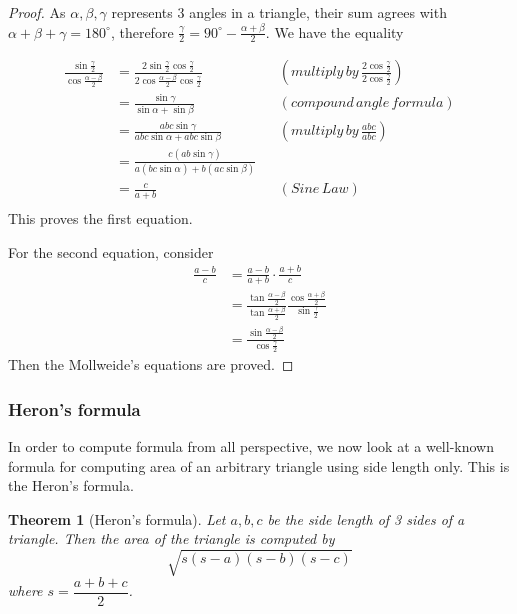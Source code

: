 \documentclass[12pt]{article}
\newtheorem*{theorem}{Theorem}
\begin{document}
    \begin{proof}
        As $\alpha,\beta,\gamma$ represents 3 angles in a triangle, their sum agrees with $\alpha+\beta+\gamma=180^\circ$, therefore $\frac{\gamma}{2}=90^\circ - \frac{\alpha+\beta}{2}$. We have the equality 
        
        \begin{align*}
            \frac{\sin{\frac{\gamma}{2}}}{\cos{\frac{\alpha-\beta}{2}}}&=\frac{2\sin{\frac{\gamma}{2}}\cos{\frac{\gamma}{2}}}{2\cos{\frac{\alpha-\beta}{2}}\cos{\frac{\gamma}{2}}}&&(multiply\, by\, \frac{2\cos{\frac{\gamma}{2}}}{2\cos{\frac{\gamma}{2}}})\\
            &=\frac{\sin{\gamma}}{\sin{\alpha}+\sin{\beta}}&&(compound\, angle\, formula)\\
            &=\frac{abc\sin{\gamma}}{abc\sin{\alpha}+abc\sin{\beta}}&&(multiply\, by\, \frac{abc}{abc})\\
            &=\frac{c(ab\sin{\gamma})}{a(bc\sin{\alpha})+b(ac\sin{\beta})}\\
            &=\frac{c}{a+b}&&(Sine\, Law)\\
        \end{align*}
        This proves the first equation.

        For the second equation, consider \begin{align*}
            \frac{a-b}{c}&=\frac{a-b}{a+b}\cdot \frac{a+b}{c}\\
            &=\frac{\tan{\frac{\alpha-\beta}{2}}}{\tan{\frac{\alpha+\beta}{2}}}\frac{\cos{\frac{\alpha+\beta}{2}}}{\sin{\frac{\gamma}{2}}}\\
            &=\frac{\sin{\frac{\alpha-\beta}{2}}}{\cos{\frac{\gamma}{2}}}
        \end{align*}
        Then the Mollweide's equations are proved.
    \end{proof}

    \subsubsection*{Heron's formula}

    In order to compute formula from all perspective, we now look at a well-known formula for computing area of an arbitrary triangle using side length only. This is the Heron's formula.

    \begin{theorem}[Heron's formula]
        Let $a,b,c$ be the side length of 3 sides of a triangle. Then the area of the triangle is computed by $$\sqrt{s(s-a)(s-b)(s-c)}$$where $s=\dfrac{a+b+c}{2}$.
    \end{theorem}
\end{document}
